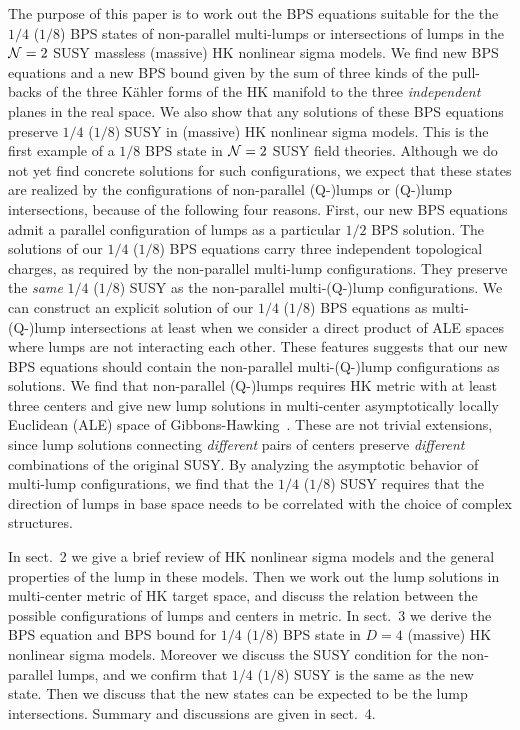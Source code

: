 \documentclass[a4paper,12pt]{article}
\newcommand{\kahler}{K\"{a}hler }
\begin{document}
The purpose of this paper is to work out the BPS equations suitable for the 
the $1/4$ ($1/8$) BPS states of non-parallel multi-lumps or 
intersections of lumps in the ${\cal N}=2$ SUSY massless (massive) HK 
nonlinear sigma models. 
We find new BPS equations and 
a new BPS bound given by 
the sum of three kinds of the pull-backs 
of the three \kahler forms of the HK manifold to 
the three {\it independent} planes in the real space.  
We also show that any solutions of these BPS equations 
preserve $1/4$ ($1/8$) SUSY in (massive) HK nonlinear sigma models.  
This is the first example of a $1/8$ BPS state 
in ${\cal N}=2$ SUSY field theories. 
Although we do not yet find concrete solutions for such configurations, 
we expect that these states are realized by the configurations 
of non-parallel (Q-)lumps or (Q-)lump intersections, because of the 
following four reasons. 
 First, our new BPS equations admit a parallel configuration of lumps 
 as a particular $1/2$ BPS solution. 
The solutions of our $1/4$ ($1/8$) BPS equations 
carry three independent topological charges, as 
required by the non-parallel multi-lump configurations.  
They preserve the {\it same} $1/4$ ($1/8$) 
SUSY as the non-parallel multi-(Q-)lump configurations. 
We can construct an explicit solution of our $1/4$ ($1/8$) BPS equations 
as multi-(Q-)lump intersections at least when we consider a direct 
product of ALE spaces where lumps are not interacting each other. 
These features suggests that our new BPS equations should contain 
 the non-parallel multi-(Q-)lump configurations as solutions.  
We find that non-parallel (Q-)lumps requires HK metric with 
at least three centers and 
give new lump solutions in multi-center 
asymptotically locally Euclidean 
(ALE) space of Gibbons-Hawking~\cite{GH}. 
These are not trivial extensions, since 
lump solutions connecting {\it different} pairs of centers 
preserve {\it different} combinations of the original SUSY. 
By analyzing the asymptotic behavior of multi-lump configurations, 
we find that the $1/4$ ($1/8$) SUSY requires that 
the direction of lumps in base space needs to be correlated with 
the choice of complex structures. 


In sect.~2 we give a brief review of HK nonlinear sigma models 
and the general properties of the lump in these models. 
Then we work out the lump solutions 
in multi-center metric of HK target space, 
and discuss the relation between the possible configurations of lumps 
and centers in metric.
In sect.~3  we derive the BPS equation and BPS bound for $1/4$ ($1/8$) 
BPS state in $D=4$ (massive) HK nonlinear sigma models.
Moreover we discuss the SUSY condition for the non-parallel lumps, 
and we confirm that $1/4$ ($1/8$) SUSY is the same as the new state. 
Then we discuss that the new states can be expected to be the lump 
intersections.
Summary and discussions are given in sect.~4.
\end{document}
